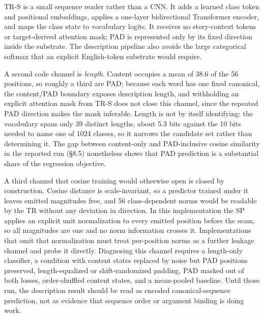 \documentclass[11pt,a4paper]{article}
\begin{document}
TR-S is a small sequence reader rather than a CNN. It adds a learned class token and positional embeddings, applies a one-layer bidirectional Transformer encoder, and maps the class state to vocabulary logits. It receives no story-context tokens or target-derived attention mask; PAD is represented only by its fixed direction inside the substrate. The description pipeline also avoids the large categorical softmax that an explicit English-token substrate would require.

A second code channel is \emph{length}. Content occupies a mean of 38.6 of the 56 positions, so roughly a third are PAD; because each word has one fixed canonical, the content/PAD boundary exposes description length, and withholding an explicit attention mask from TR-S does not close this channel, since the repeated PAD direction makes the mask inferable. Length is not by itself identifying: the vocabulary spans only 39 distinct lengths, about 5.3 bits against the 10 bits needed to name one of 1024 classes, so it narrows the candidate set rather than determining it. The gap between content-only and PAD-inclusive cosine similarity in the reported run (§8.5) nonetheless shows that PAD prediction is a substantial share of the regression objective.

A third channel that cosine training would otherwise open is closed by construction. Cosine distance is scale-invariant, so a predictor trained under it leaves emitted magnitudes free, and 56 class-dependent norms would be readable by the TR without any deviation in direction. In this implementation the SP applies an explicit unit normalization to every emitted position before the seam, so all magnitudes are one and no norm information crosses it. Implementations that omit that normalization must treat per-position norms as a further leakage channel and probe it directly. Diagnosing this channel requires a length-only classifier, a condition with content states replaced by noise but PAD positions preserved, length-equalized or shift-randomized padding, PAD masked out of both losses, order-shuffled content states, and a mean-pooled baseline. Until those run, the description result should be read as encoded canonical-sequence prediction, not as evidence that sequence order or argument binding is doing work.
\end{document}
